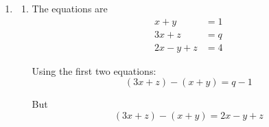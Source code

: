 \documentclass[leqno]{article}
\begin{document}
\begin{enumerate}[
  label=\textbf{\arabic*.},
  leftmargin=*,
  topsep=0pt,
  partopsep=0pt,
  parsep=0pt
]
\begin{djsSolution}
\begin{enumerate}[label=\textbf{(\alph*)}]
  From the first equation:
  \[
  y=1-x
  \]

  Substitute into the second equation:
  \begin{align*}
  3x+2(1-x)+z&=p \\
  3x+2-2x+z&=p \\
  x+z&=p-2
  \end{align*}

  Substitute into the third equation:
  \begin{align*}
  2x-(1-x)+z&=4 \\
  2x-1+x+z&=4 \\
  3x+z&=5
  \end{align*}

  So we now have
  \[
  x+z=p-2
  \qquad\text{and}\qquad
  3x+z=5
  \]

  Subtract the first from the second:
  \begin{align*}
  (3x+z)-(x+z)&=5-(p-2) \\
  2x&=7-p \\
  x&=\frac{7-p}{2}
  \end{align*}

  Then
  \begin{align*}
  y&=1-x \\
   &=1-\frac{7-p}{2} \\
   &=\frac{2-7+p}{2} \\
   &=\frac{p-5}{2}
  \end{align*}

  And using $3x+z=5$:
  \begin{align*}
  z&=5-3x \\
   &=5-3\left(\frac{7-p}{2}\right) \\
   &=\frac{10-21+3p}{2} \\
   &=\frac{3p-11}{2}
  \end{align*}

  which gives the same point.

  \item
  \begin{enumerate}[label=(\roman*)]
    \item The equations are
    \[
    \begin{aligned}
    x+y&=1 \\
    3x+z&=q \\
    2x-y+z&=4
    \end{aligned}
    \]

    Using the first two equations:
    \[
    (3x+z)-(x+y)=q-1
    \]

    But
    \[
    (3x+z)-(x+y)=2x-y+z
    \]


\end{enumerate}
\end{enumerate}
\end{djsSolution}
\end{enumerate}
\end{document}
